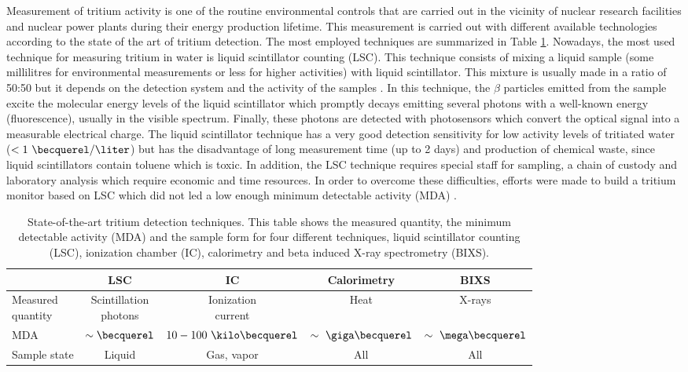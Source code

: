 Measurement of tritium activity is one of the routine environmental controls that are carried out in the vicinity of nuclear research facilities and nuclear power plants during their energy production lifetime. This measurement is carried out with different available technologies according to the state of the art of tritium detection. The most employed techniques are summarized in Table \ref{tab:DifferentThecnics}. Nowadays, the most used technique for measuring tritium in water is liquid scintillator counting (LSC). This technique consists of mixing a liquid sample (some millilitres for environmental measurements or less for higher activities) with liquid scintillator. This mixture is usually made in a ratio of 50:50 but it depends on the detection system and the activity of the samples \cite{LSCothers, Hofstetter1}. In this technique, the $\beta$ particles emitted from the sample excite the molecular energy levels of the liquid scintillator which promptly decays emitting several photons with a well-known energy (fluorescence), usually in the visible spectrum. Finally, these photons are detected with photosensors which convert the optical signal into a measurable electrical charge. The liquid scintillator technique has a very good detection sensitivity for low activity levels of tritiated water ($<1~\becquerel/\liter$) \cite{0.6Bq_L} but has the disadvantage of long measurement time (up to 2 days) and production of chemical waste, since liquid scintillators contain toluene which is toxic. In addition, the LSC technique requires special staff for sampling, a chain of custody and laboratory analysis which require economic and time resources. In order to overcome these difficulties, efforts were made to build a tritium monitor based on LSC which did not led a low enough minimum detectable activity (MDA) \cite{OnlineLSC}. 

{\renewcommand{\arraystretch}{1.8}
\begin{table}[htbp]
\centering{}%
\begin{tabular}{lcccc}
\toprule 
 & LSC & IC & Calorimetry & BIXS \tabularnewline
\midrule
\midrule 
\parbox{5em}{Measured\\ quantity} & \parbox{5em}{\centering Scintillation\\ photons} &  \parbox{5em}{\centering Ionization\\ current} & Heat & X-rays \tabularnewline
MDA & $\sim\becquerel$ & $10-100~\kilo\becquerel$ & $\sim~\giga\becquerel$ & $\sim~\mega\becquerel$ \tabularnewline
Sample state & Liquid & Gas, vapor & All & All \tabularnewline
\bottomrule
\end{tabular}
\caption{State-of-the-art tritium detection techniques. This table shows the measured quantity, the minimum detectable activity (MDA) and the sample form for four different techniques, liquid scintillator counting (LSC), ionization chamber (IC), calorimetry and beta induced X-ray spectrometry (BIXS).}
\label{tab:DifferentThecnics}
\end{table}}

